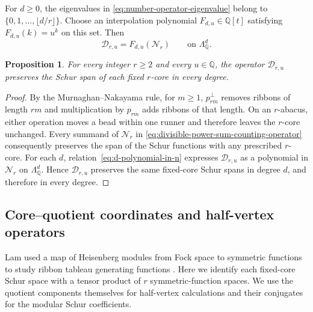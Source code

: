 \documentclass[12pt,reqno,a4paper]{amsart}
\numberwithin{equation}{section}
\numberwithin{figure}{section}
\theoremstyle{plain}
\newtheorem{proposition}[theorem]{Proposition}
\theoremstyle{definition}
\begin{document}
For $d\geq0$, the eigenvalues in
\eqref{eq:number-operator-eigenvalue} belong to
$\{0,1,\ldots,\lfloor d/r\rfloor\}$.  Choose an interpolation
polynomial $F_{d,u}\in\mathbb Q[t]$ satisfying $F_{d,u}(k)=u^k$ on
this set.  Then
\begin{equation}\label{eq:d-polynomial-in-n}
\mathcal D_{r,u}=F_{d,u}(\mathcal N_r)
\qquad\text{on }\Lambda_{\mathbb Q}^d.
\end{equation}

\begin{proposition}
\label{prop:d-core-span-preservation}
For every integer $r\geq2$ and every $u\in\mathbb Q$, the operator
$\mathcal D_{r,u}$ preserves the Schur span of each fixed $r$-core in
every degree.
\end{proposition}

\begin{proof}
By the Murnaghan--Nakayama rule, for $m\geq1$,
$p_{rm}^{\perp}$ removes ribbons of
length $rm$ and multiplication by $p_{rm}$ adds ribbons of that
length.  On an $r$-abacus, either operation moves a bead within one
runner and therefore leaves the $r$-core unchanged.  Every summand of
$\mathcal N_r$ in \eqref{eq:divisible-power-sum-counting-operator}
consequently preserves the span of the Schur functions
with any prescribed $r$-core.
For each $d$, relation~\eqref{eq:d-polynomial-in-n}
expresses $\mathcal D_{r,u}$ as a polynomial in $\mathcal N_r$ on
$\Lambda_{\mathbb Q}^d$.  Hence $\mathcal D_{r,u}$ preserves the same
fixed-core Schur spans in degree $d$, and therefore in every degree.
\end{proof}

\subsection{Core--quotient coordinates and half-vertex operators}
\label{subsec:heisenberg-intertwiner}

Lam used a map of Heisenberg modules from Fock space to symmetric
functions to study ribbon tableau generating functions
\cite[Theorem~9]{LamRibbon}.  Here we identify each fixed-core Schur
space with a tensor product of $r$ symmetric-function spaces.  We use the quotient
components themselves for half-vertex calculations and their
conjugates for the modular Schur coefficients.
\end{document}

